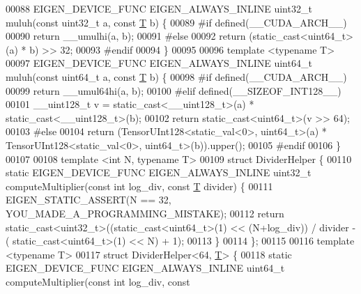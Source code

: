 \begin{DoxyCode}
00088   EIGEN\_DEVICE\_FUNC EIGEN\_ALWAYS\_INLINE uint32\_t muluh(\textcolor{keyword}{const} uint32\_t a, \textcolor{keyword}{const} \hyperlink{group___sparse_core___module_class_eigen_1_1_triplet}{T} b) \{
00089 \textcolor{preprocessor}{#if defined(\_\_CUDA\_ARCH\_\_)}
00090     \textcolor{keywordflow}{return} \_\_umulhi(a, b);
00091 \textcolor{preprocessor}{#else}
00092     \textcolor{keywordflow}{return} (static\_cast<uint64\_t>(a) * b) >> 32;
00093 \textcolor{preprocessor}{#endif}
00094   \}
00095 
00096   \textcolor{keyword}{template} <\textcolor{keyword}{typename} T>
00097   EIGEN\_DEVICE\_FUNC EIGEN\_ALWAYS\_INLINE uint64\_t muluh(\textcolor{keyword}{const} uint64\_t a, \textcolor{keyword}{const} \hyperlink{group___sparse_core___module_class_eigen_1_1_triplet}{T} b) \{
00098 \textcolor{preprocessor}{#if defined(\_\_CUDA\_ARCH\_\_)}
00099     \textcolor{keywordflow}{return} \_\_umul64hi(a, b);
00100 \textcolor{preprocessor}{#elif defined(\_\_SIZEOF\_INT128\_\_)}
00101     \_\_uint128\_t v = \textcolor{keyword}{static\_cast<}\_\_uint128\_t\textcolor{keyword}{>}(a) * static\_cast<\_\_uint128\_t>(b);
00102     \textcolor{keywordflow}{return} \textcolor{keyword}{static\_cast<}uint64\_t\textcolor{keyword}{>}(v >> 64);
00103 \textcolor{preprocessor}{#else}
00104     \textcolor{keywordflow}{return} (TensorUInt128<static\_val<0>, uint64\_t>(a) * TensorUInt128<static\_val<0>, uint64\_t>(b)).upper();
00105 \textcolor{preprocessor}{#endif}
00106   \}
00107 
00108   \textcolor{keyword}{template} <\textcolor{keywordtype}{int} N, \textcolor{keyword}{typename} T>
00109   \textcolor{keyword}{struct }DividerHelper \{
00110     \textcolor{keyword}{static} EIGEN\_DEVICE\_FUNC EIGEN\_ALWAYS\_INLINE uint32\_t computeMultiplier(\textcolor{keyword}{const} \textcolor{keywordtype}{int} log\_div, \textcolor{keyword}{const} 
      \hyperlink{group___sparse_core___module_class_eigen_1_1_triplet}{T} divider) \{
00111       EIGEN\_STATIC\_ASSERT(N == 32, YOU\_MADE\_A\_PROGRAMMING\_MISTAKE);
00112       \textcolor{keywordflow}{return} \textcolor{keyword}{static\_cast<}uint32\_t\textcolor{keyword}{>}((\textcolor{keyword}{static\_cast<}uint64\_t\textcolor{keyword}{>}(1) << (N+log\_div)) / divider - (
      static\_cast<uint64\_t>(1) << N) + 1);
00113     \}
00114   \};
00115 
00116   \textcolor{keyword}{template} <\textcolor{keyword}{typename} T>
00117   \textcolor{keyword}{struct }DividerHelper<64, \hyperlink{group___sparse_core___module_class_eigen_1_1_triplet}{T}> \{
00118     \textcolor{keyword}{static} EIGEN\_DEVICE\_FUNC EIGEN\_ALWAYS\_INLINE uint64\_t computeMultiplier(\textcolor{keyword}{const} \textcolor{keywordtype}{int} log\_div, \textcolor{keyword}{const} 

\end{DoxyCode}
